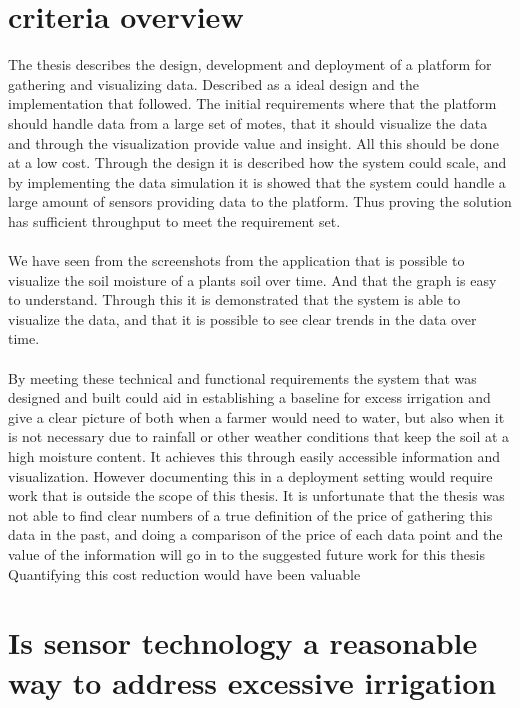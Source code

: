 \documentclass[]{uiophd}
\begin{document}
\section{criteria overview}
The thesis describes the design, development and deployment of a platform for gathering and visualizing data. Described as a ideal design and the implementation that followed. The initial requirements where that the platform should handle data from a large set of motes, that it should visualize the data and through the visualization provide value and insight. All this should be done at a low cost. Through the design it is described how the system could scale, and by implementing the data simulation it is showed that the system could handle a large amount of sensors providing data to the platform. Thus proving the solution has sufficient throughput to meet the requirement set.
\\\\
We have seen from the screenshots from the application that is possible to visualize the soil moisture of a plants soil over time. And that the graph is easy to understand. Through this it is demonstrated that the system is able to visualize the data, and that it is possible to see clear trends in the data over time.
\\\\
By meeting these technical and functional requirements the system that was  designed and built could aid in establishing a baseline for excess irrigation and give a clear picture of both when a farmer would need to water, but also when it is not necessary due to rainfall or other weather conditions that keep the soil at a high moisture content. It achieves this through easily accessible information and visualization. However documenting this in a deployment setting would require work that is outside the scope of this thesis. It is unfortunate that the thesis was not able to find clear numbers of a true definition of the price of gathering this data in the past, and doing a comparison of the price of each data point and the value of the information will go in to the suggested future work for this thesis Quantifying this cost reduction would have been valuable


\section{ Is sensor technology a reasonable way to address excessive irrigation}
\end{document}
